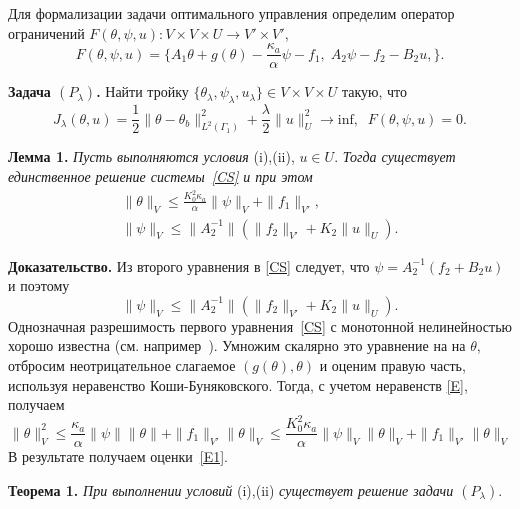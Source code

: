 Для формализации задачи оптимального управления
определим оператор
ограничений $F(\theta, \psi, u) : V \times V \times U \rightarrow V' \times V'$,
\[
    F(\theta, \psi, u) = \{A_1\theta+g(\theta)-\frac{\kappa_a}{\alpha}\psi-f_1 ,\;
    A_2\psi-f_2-B_2u, \}.
\]


\textbf{Задача $(P_\lambda)$.} Найти тройку $\{\theta_\lambda, \psi_\lambda, u_\lambda \} \in V \times V \times U$
такую, что
\begin{equation}
    \label{CP}
    J_\lambda(\theta, u) = \frac{1}{2}\|\theta -\theta_b\|^2_{L^2(\Gamma_1)}
    + \frac{\lambda}{2}\|u\|^2_U \rightarrow \text{inf},\;\; F(\theta, \psi, u)=0.
\end{equation}

\textbf{Лемма 1.}
\textit{
    Пусть выполняются условия} (i),(ii), $u\in U$. \textit{ Тогда
существует единственное решение системы~\eqref{CS} и при этом}
\begin{equation}
    \label{E1}
    \begin{aligned}
        \|\theta\|_V \leq
        \frac{K_0^2\kappa_a}{\alpha}\|\psi\|_V+\|f_1\|_{V'}, \\
        \|\psi\|_V\leq \|A_2^{-1}\|\left(\|f_2\|_{V'}+K_2\|u\|_U\right).
    \end{aligned}
\end{equation}

\textbf{Доказательство.}
Из второго уравнения в \eqref{CS} следует, что $\psi=A_2^{-1}(f_2+B_2u)$  и поэтому
$$
\|\psi\|_V\leq \|A_2^{-1}\|\left(\|f_2\|_{V'}+K_2\|u\|_U\right).
$$
Однозначная разрешимость первого уравнения~\eqref{CS} с монотонной нелинейностью хорошо известна (см.
например~\cite{Kufner}). Умножим скалярно это уравнение на
на $\theta $, отбросим неотрицательное
слагаемое $(g(\theta),\theta)$ и оценим правую часть, используя неравенство Коши-Буняковского.
Тогда, с учетом неравенств \eqref{E}, получаем
\[
    \|\theta\|^2_V \leq \frac{\kappa_a}{\alpha}\|\psi\|\|\theta\|+\|f_1\|_{V'}\|\theta\|_V\leq
    \frac{K_0^2\kappa_a}{\alpha}\|\psi\|_V\|\theta\|_V+\|f_1\|_{V'}\|\theta\|_V
\]
В результате получаем оценки~\eqref{E1}.

\textbf{Теорема 1.}
\textit{
    При выполнении условий} (i),(ii)
\textit{ существует решение задачи $(P_\lambda).$
}

